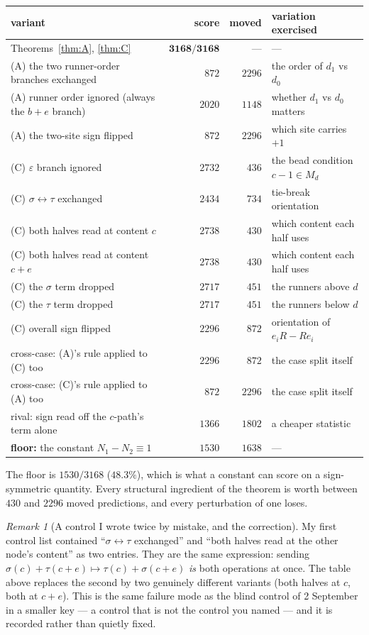 \documentclass[11pt]{article}
\theoremstyle{definition}
\theoremstyle{remark}
\newtheorem{remark}[theorem]{Remark}
\begin{document}
\begin{center}
\begin{tabular}{lrrl}
\hline
variant & score & moved & variation exercised\\
\hline
Theorems~\ref{thm:A}, \ref{thm:C} & $\mathbf{3168/3168}$ & --- & ---\\
(A) the two runner-order branches exchanged & $872$ & $2296$ & the order of $d_1$ vs $d_0$\\
(A) runner order ignored (always the $b+e$ branch) & $2020$ & $1148$ & whether $d_1$ vs $d_0$ matters\\
(A) the two-site sign flipped & $872$ & $2296$ & which site carries $+1$\\
(C) $\varepsilon$ branch ignored & $2732$ & $436$ & the bead condition $c-1\in M_d$\\
(C) $\sigma\leftrightarrow\tau$ exchanged & $2434$ & $734$ & tie-break orientation\\
(C) both halves read at content $c$ & $2738$ & $430$ & which content each half uses\\
(C) both halves read at content $c+e$ & $2738$ & $430$ & which content each half uses\\
(C) the $\sigma$ term dropped & $2717$ & $451$ & the runners above $d$\\
(C) the $\tau$ term dropped & $2717$ & $451$ & the runners below $d$\\
(C) overall sign flipped & $2296$ & $872$ & orientation of $e_iR-Re_i$\\
cross-case: (A)'s rule applied to (C) too & $2296$ & $872$ & the case split itself\\
cross-case: (C)'s rule applied to (A) too & $872$ & $2296$ & the case split itself\\
rival: sign read off the $c$-path's term alone & $1366$ & $1802$ & a cheaper statistic\\
\textbf{floor:} the constant $N_1-N_2\equiv1$ & $1530$ & $1638$ & --- \\
\hline
\end{tabular}
\end{center}

The floor is $1530/3168$ ($48.3\%$), which is what a constant can score on a
sign-symmetric quantity. Every structural ingredient of the theorem is worth between
$430$ and $2296$ moved predictions, and every perturbation of one loses.

\begin{remark}[A control I wrote twice by mistake, and the correction]
My first control list contained ``$\sigma\leftrightarrow\tau$ exchanged'' and ``both
halves read at the other node's content'' as two entries. They are the same expression:
sending $\sigma(c)+\tau(c+e)\mapsto\tau(c)+\sigma(c+e)$ \emph{is} both operations at once.
The table above replaces the second by two genuinely different variants (both halves at
$c$, both at $c+e$). This is the same failure mode as the blind control of 2 September in
a smaller key --- a control that is not the control you named --- and it is recorded
rather than quietly fixed.
\end{remark}
\end{document}
